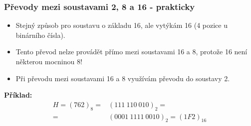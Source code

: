 	\begin{frame}
    \frametitle{Převody mezi soustavami 2, 8 a 16 - prakticky}
		
		\begin{minipage}[t][0.5\textheight][t]{\textwidth}
			\boldmath
			\begin{itemize}
				\item Stejný způsob pro soustavu o základu 16, ale vytýkám 16 (4 pozice u binárního čísla).
				\item Tento převod nelze provádět přímo mezi soustavami 16 a 8, protože 16 není některou mocninou 8!
				\item Při převodu mezi soustavami 16 a 8 využívám převodu do soustavy 2.
			\end{itemize}
		\end{minipage}
		
		\begin{minipage}[t][0.4\textheight][t]{\textwidth}
		\boldmath
		\textbf{Příklad:}
			\begin{align*}
			H = (762)_8 =& (111\:110\:010)_2 = \\[3pt]
			            =& (0001\:1111\:0010)_2 = (1F2)_{16}
			\end{align*}
		\end{minipage}
		
	\end{frame}
